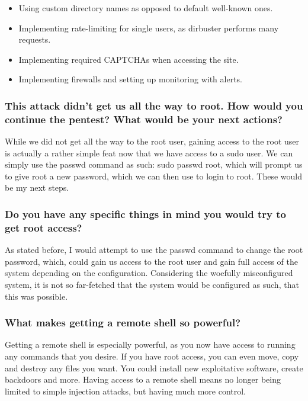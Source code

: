\begin{itemize}
  \item Using custom directory names as opposed to default well-known ones.
  \item Implementing rate-limiting for single users, as dirbuster performs many requests.
  \item Implementing required CAPTCHAs when accessing the site.
  \item Implementing firewalls and setting up monitoring with alerts.
\end{itemize}

\subsubsection{This attack didn't get us all the way to root. How would you continue the pentest? What would be your next actions?}
While we did not get all the way to the root user, gaining access to the root user is actually a rather simple feat now that we have access to a sudo user. We can simply use the passwd command as such: sudo passwd root, which will prompt us to give root a new password, which we can then use to login to root. These would be my next steps.

\subsubsection{Do you have any specific things in mind you would try to get root access?}
As stated before, I would attempt to use the passwd command to change the root password, which, could gain us access to the root user and gain full access of the system depending on the configuration. Considering the woefully misconfigured system, it is not so far-fetched that the system would be configured as such, that this was possible.

\subsubsection{What makes getting a remote shell so powerful?}
Getting a remote shell is especially powerful, as you now have access to running any commands that you desire. If you have root access, you can even move, copy and destroy any files you want. You could install new exploitative software, create backdoors and more. Having access to a remote shell means no longer being limited to simple injection attacks, but having much more control.